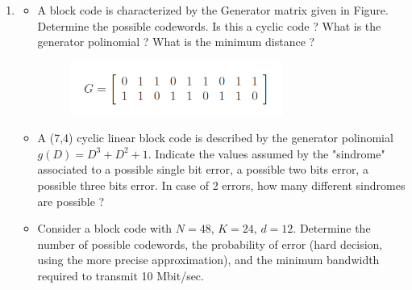 \documentclass[11pt]{article}
\begin{document}
\begin{enumerate}
\item 
\begin{itemize}
\item A block code is characterized by the Generator matrix given in Figure. Determine the possible codewords. Is this a cyclic code ? What is the generator polinomial ? What is the minimum distance ? 
\begin{figure}[ht] \centering
\includegraphics[width=7cm]{Fig1}
\end{figure}
\item A (7,4) cyclic linear block code is described by the generator polinomial $g(D)=D^3+D^2+1$. Indicate the values assumed by the "sindrome" associated to a possible single bit error, a possible two bits error, a possible three bits error. In case of 2 errors, how many different sindromes are possible ?
\item Consider a block code with $N=48$, $K=24$, $d=12$. Determine the number of possible codewords, the probability of error (hard decision,  using the more precise approximation), and the minimum bandwidth required to transmit 10 Mbit/sec.
\end{itemize}

\end{enumerate}
\end{document}
